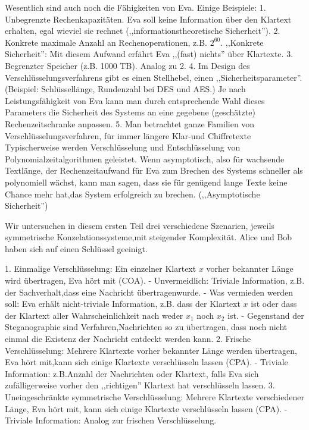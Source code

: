 \documentclass[a4paper]{article}
\begin{document}
\begin{multicols}{3}
Wesentlich sind auch noch die Fähigkeiten von Eva. Einige Beispiele:
1. Unbegrenzte Rechenkapazitäten. Eva soll keine Information über den Klartext erhalten, egal wieviel sie rechnet (,,informationstheoretische Sicherheit'').
2. Konkrete maximale Anzahl an Rechenoperationen, z.B. $2^{60}$. ,,Konkrete Sicherheit'': Mit diesem Aufwand erfährt Eva ,,(fast) nichts'' über Klartexte.
3. Begrenzter Speicher (z.B. 1000 TB). Analog zu 2.
4. Im Design des Verschlüsselungsverfahrens gibt es einen Stellhebel, einen ,,Sicherheitsparameter''. (Beispiel: Schlüssellänge, Rundenzahl bei DES und AES.) Je nach Leistungsfähigkeit von Eva kann man durch entsprechende Wahl dieses Parameters die Sicherheit des Systems an eine gegebene (geschätzte) Rechenzeitschranke anpassen.
5. Man betrachtet ganze Familien von Verschlüsselungsverfahren, für immer längere Klar-und Chiffretexte Typischerweise werden Verschlüsselung und Entschlüsselung von Polynomialzeitalgorithmen geleistet. Wenn asymptotisch, also für wachsende Textlänge, der Rechenzeitaufwand für Eva zum Brechen des Systems schneller als polynomiell wächst, kann man sagen, dass sie für genügend lange Texte keine Chance mehr hat,das System erfolgreich zu brechen. (,,Asymptotische Sicherheit'')

Wir untersuchen in diesem ersten Teil drei verschiedene Szenarien, jeweils symmetrische Konzelationssysteme,mit steigender Komplexität. Alice und Bob haben sich auf einen Schlüssel geeinigt.

1. Einmalige Verschlüsselung: Ein einzelner Klartext $x$ vorher bekannter Länge wird übertragen, Eva hört mit (COA).
   - Unvermeidlich: Triviale Information, z.B. der Sachverhalt,dass eine Nachricht übertragenwurde.
   - Was vermieden werden soll: Eva erhält nicht-triviale Information, z.B. dass der Klartext $x$ ist oder dass der Klartext aller Wahrscheinlichkeit nach weder $x_1$ noch $x_2$ ist.
   - Gegenstand der Steganographie sind Verfahren,Nachrichten so zu übertragen, dass noch nicht einmal die Existenz der Nachricht entdeckt werden kann.
2. Frische Verschlüsselung: Mehrere Klartexte vorher bekannter Länge werden übertragen, Eva hört mit,kann sich einige Klartexte verschlüsseln lassen (CPA).
   - Triviale Information: z.B.Anzahl der Nachrichten oder Klartext, falls Eva sich zufälligerweise vorher den ,,richtigen'' Klartext hat verschlüsseln lassen.
3. Uneingeschränkte symmetrische Verschlüsselung: Mehrere Klartexte verschiedener Länge, Eva hört mit, kann sich einige Klartexte verschlüsseln lassen (CPA).
   - Triviale Information: Analog zur frischen Verschlüsselung.


\end{multicols}
\end{document}
